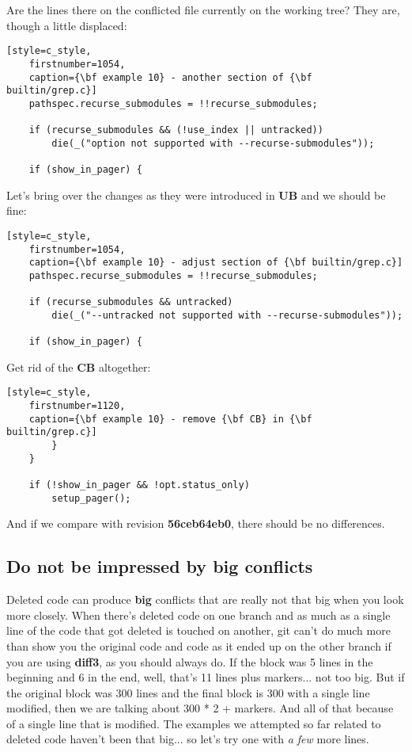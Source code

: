 Are the lines there on the conflicted file currently on the working tree? They are, though a little displaced:
\begin{lstlisting}[style=c_style,
	firstnumber=1054,
	caption={\bf example 10} - another section of {\bf builtin/grep.c}]
	pathspec.recurse_submodules = !!recurse_submodules;

	if (recurse_submodules && (!use_index || untracked))
		die(_("option not supported with --recurse-submodules"));

	if (show_in_pager) {
\end{lstlisting}

Let's bring over the changes as they were introduced in {\bf UB} and we should be fine:
\begin{lstlisting}[style=c_style,
	firstnumber=1054,
	caption={\bf example 10} - adjust section of {\bf builtin/grep.c}]
	pathspec.recurse_submodules = !!recurse_submodules;

	if (recurse_submodules && untracked)
		die(_("--untracked not supported with --recurse-submodules"));

	if (show_in_pager) {
\end{lstlisting}

Get rid of the {\bf CB} altogether:
\begin{lstlisting}[style=c_style,
	firstnumber=1120,
	caption={\bf example 10} - remove {\bf CB} in {\bf builtin/grep.c}]
		}
	}

	if (!show_in_pager && !opt.status_only)
		setup_pager();
\end{lstlisting}

And if we compare with revision {\bf 56ceb64eb0}, there should be no differences.

\subsection{Do not be impressed by big conflicts}
Deleted code can produce {\bf big} conflicts that are really not that big when you look more closely. When there's
deleted code on one branch and as much as a single line of the code that got deleted is touched on another,
git can't do much more than show you the original code and code as it ended up on the other branch if you are using {\bf diff3}, as
you should always do. If the block was 5 lines in the beginning and 6 in the end, well, that's 11 lines plus markers... not too big.
But if the original block was 300 lines and the final block is 300 with a single line modified, then we are talking about
300 * 2 + markers. And all of that because of a single line that is modified. The examples we attempted so far related to deleted
code haven't been that big... so let's try one with {\it a few} more lines.


